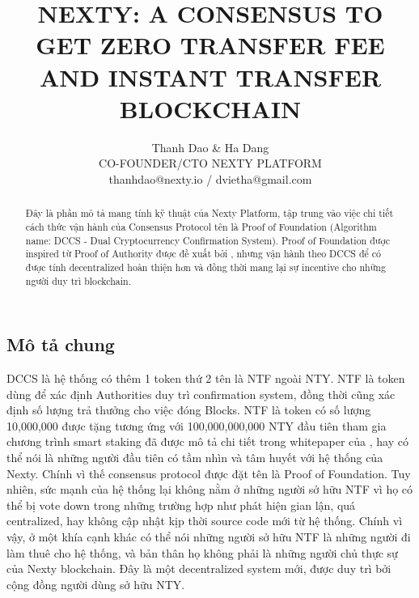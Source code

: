 \documentclass[12pt,oneside]{amsart}
\title{NEXTY: A CONSENSUS TO GET ZERO TRANSFER FEE AND INSTANT TRANSFER BLOCKCHAIN}
\author{
	Thanh Dao \& Ha Dang \\
	CO-FOUNDER/CTO NEXTY PLATFORM \\
	thanhdao@nexty.io / dvietha@gmail.com
}
\date{} %
\begin{document}
\pagecolor{pagecolor}
\begin{abstract}
Đây là phần mô tả mang tính kỹ thuật của Nexty Platform, tập trung vào việc chi tiết cách thức vận hành của Consensus Protocol tên là Proof of Foundation (Algorithm name: DCCS - Dual Cryptocurrency Confirmation System). Proof of Foundation được inspired từ Proof of Authority được đề xuất bởi \cite{clique}, nhưng vận hành theo DCCS để có được tính decentralized hoàn thiện hơn và đồng thời mang lại sự incentive cho những người duy trì blockchain.
\end{abstract}

\maketitle

\setlength{\columnsep}{20pt}
\begin{multicols}{2}

\section{Mô tả chung}\label{sec:introduction}
DCCS là hệ thống có thêm 1 token thứ 2 tên là NTF ngoài NTY. NTF là token dùng để xác định Authorities duy trì confirmation system, đồng thời cũng xác định số lượng trả thưởng cho việc đóng Blocks. NTF là token có số lượng 10,000,000 được tặng tương ứng với 100,000,000,000 NTY đầu tiên tham gia chương trình smart staking đã được mô tả chi tiết trong whitepaper của \cite{smart-taking}, hay có thể nói là những người đầu tiên có tầm nhìn và tâm huyết với hệ thống của Nexty. Chính vì thế consensus protocol được đặt tên là Proof of Foundation. Tuy nhiên, sức mạnh của hệ thống lại không nằm ở những người sở hữu NTF vì họ có thể bị vote down trong những trường hợp như phát hiện gian lận, quá centralized, hay không cập nhật kịp thời source code mới từ hệ thống. Chính vì vậy, ở một khía cạnh khác có thể nói những người sở hữu NTF là những người đi làm thuê cho hệ thống, và bản thân họ không phải là những người chủ thực sự của Nexty blockchain. Đây là một decentralized system mới, được duy trì bởi cộng đồng người dùng sở hữu NTY.


\end{multicols}
\end{document}
